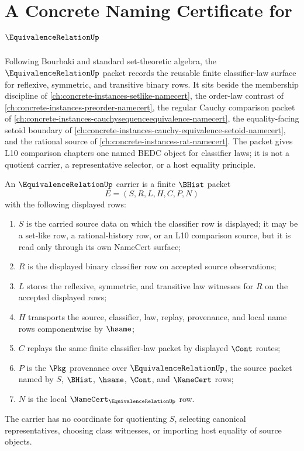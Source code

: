 \chapter{A Concrete Naming Certificate for $\EquivalenceRelationUp$}
\label{ch:concrete-instances-equivalence-relation-namecert}

Following Bourbaki and standard set-theoretic algebra, the $\EquivalenceRelationUp$ packet records the reusable finite classifier-law surface for reflexive, symmetric, and transitive binary rows. It sits beside the membership discipline of \autoref{ch:concrete-instances-setlike-namecert}, the order-law contrast of \autoref{ch:concrete-instances-preorder-namecert}, the regular Cauchy comparison packet of \autoref{ch:concrete-instances-cauchysequenceequivalence-namecert}, the equality-facing setoid boundary of \autoref{ch:concrete-instances-cauchy-equivalence-setoid-namecert}, and the rational source of \autoref{ch:concrete-instances-rat-namecert}. The packet gives L10 comparison chapters one named BEDC object for classifier laws; it is not a quotient carrier, a representative selector, or a host equality principle.

\begin{definition}
\label{def:equivalence-relation-carrier}
An $\EquivalenceRelationUp$ carrier is a finite $\BHist$ packet
$$
E=(S,R,L,H,C,P,N)
$$
with the following displayed rows:
\begin{enumerate}
\item $S$ is the carried source data on which the classifier row is displayed; it may be a set-like row, a rational-history row, or an L10 comparison source, but it is read only through its own NameCert surface;
\item $R$ is the displayed binary classifier row on accepted source observations;
\item $L$ stores the reflexive, symmetric, and transitive law witnesses for $R$ on the accepted displayed rows;
\item $H$ transports the source, classifier, law, replay, provenance, and local name rows componentwise by $\hsame$;
\item $C$ replays the same finite classifier-law packet by displayed $\Cont$ routes;
\item $P$ is the $\Pkg$ provenance over $\EquivalenceRelationUp$, the source packet named by $S$, $\BHist$, $\hsame$, $\Cont$, and $\NameCert$ rows;
\item $N$ is the local $\NameCert_{\EquivalenceRelationUp}$ row.
\end{enumerate}
The carrier has no coordinate for quotienting $S$, selecting canonical representatives, choosing class witnesses, or importing host equality of source objects.
\end{definition}

